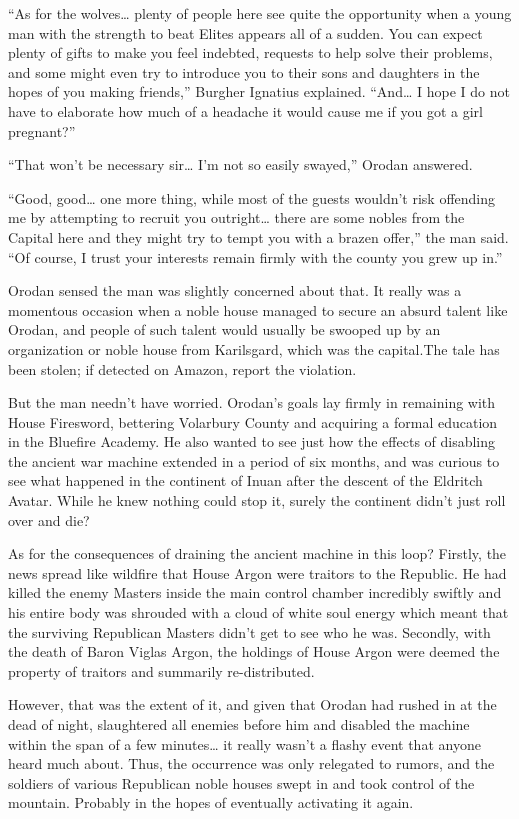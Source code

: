 \documentclass[a4paper,10pt]{book}
\begin{document}
“As for the wolves… plenty of people here see quite the opportunity when a young man with the strength to beat Elites appears all of a sudden. You can expect plenty of gifts to make you feel indebted, requests to help solve their problems, and some might even try to introduce you to their sons and daughters in the hopes of you making friends,” Burgher Ignatius explained. “And… I hope I do not have to elaborate how much of a headache it would cause me if you got a girl pregnant?”\par
“That won’t be necessary sir… I’m not so easily swayed,” Orodan answered.\par
“Good, good… one more thing, while most of the guests wouldn’t risk offending me by attempting to recruit you outright… there are some nobles from the Capital here and they might try to tempt you with a brazen offer,” the man said. “Of course, I trust your interests remain firmly with the county you grew up in.”\par
Orodan sensed the man was slightly concerned about that. It really was a momentous occasion when a noble house managed to secure an absurd talent like Orodan, and people of such talent would usually be swooped up by an organization or noble house from Karilsgard, which was the capital.The tale has been stolen; if detected on Amazon, report the violation.\par
But the man needn’t have worried. Orodan’s goals lay firmly in remaining with House Firesword, bettering Volarbury County and acquiring a formal education in the Bluefire Academy. He also wanted to see just how the effects of disabling the ancient war machine extended in a period of six months, and was curious to see what happened in the continent of Inuan after the descent of the Eldritch Avatar. While he knew nothing could stop it, surely the continent didn’t just roll over and die?\par
As for the consequences of draining the ancient machine in this loop? Firstly, the news spread like wildfire that House Argon were traitors to the Republic. He had killed the enemy Masters inside the main control chamber incredibly swiftly and his entire body was shrouded with a cloud of white soul energy which meant that the surviving Republican Masters didn’t get to see who he was. Secondly, with the death of Baron Viglas Argon, the holdings of House Argon were deemed the property of traitors and summarily re-distributed.\par
However, that was the extent of it, and given that Orodan had rushed in at the dead of night, slaughtered all enemies before him and disabled the machine within the span of a few minutes… it really wasn’t a flashy event that anyone heard much about. Thus, the occurrence was only relegated to rumors, and the soldiers of various Republican noble houses swept in and took control of the mountain. Probably in the hopes of eventually activating it again.\par
\end{document}
